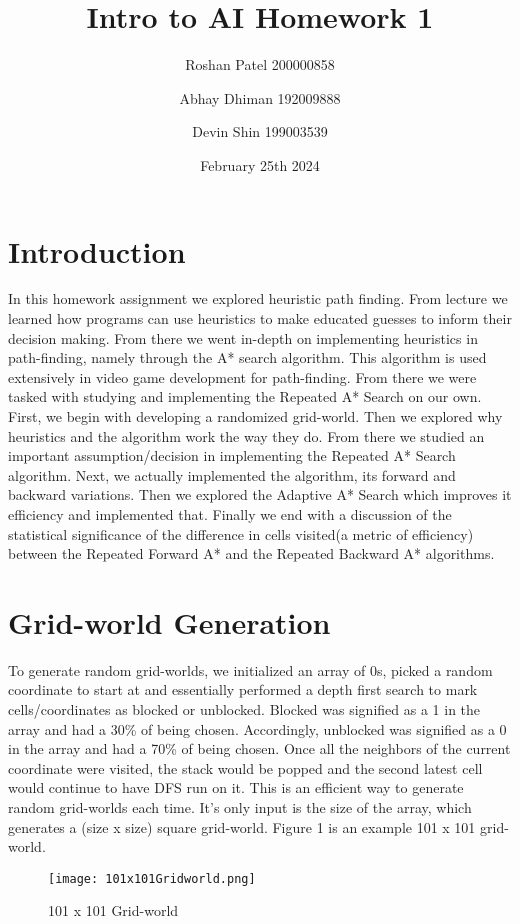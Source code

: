 \documentclass{article}
\title{Intro to AI Homework 1}
\author{Roshan Patel 200000858\\
 \and Abhay Dhiman 192009888\\
 \and Devin Shin 199003539}
\date{February 25th 2024}
\begin{document}
\maketitle

\section{Introduction}
In this homework assignment we explored heuristic path finding.  From lecture we learned how programs can use heuristics to make educated guesses to inform their decision making. From there we went in-depth on implementing heuristics in path-finding, namely through the A* search algorithm. This algorithm is used extensively in video game development for path-finding. From there we were tasked with studying and implementing the Repeated A* Search on our own.  
\newline
\newline
First, we begin with developing a randomized grid-world. Then we explored why heuristics and the algorithm work the way they do. From there we studied an important assumption/decision in implementing the Repeated A* Search algorithm. Next, we actually implemented the algorithm, its forward and backward variations. Then we explored the Adaptive A* Search which improves it efficiency and implemented that. Finally we end with a discussion of the statistical significance of the difference in cells visited(a metric of efficiency) between the Repeated Forward A* and the Repeated Backward A* algorithms.
\section {Grid-world Generation}
To generate random grid-worlds, we initialized an array of 0s, picked a random coordinate to start at and essentially performed a depth first search to mark cells/coordinates as blocked or unblocked. Blocked was signified as a 1 in the array and had a 30\% of being chosen. Accordingly, unblocked was signified as a 0 in the array and had a 70\% of being chosen. Once all the neighbors of the current coordinate were visited, the stack would be popped and the second latest cell would continue to have DFS run on it. This is an efficient way to generate random grid-worlds each time. It's only input is the size of the array, which generates a (size x size) square grid-world. Figure 1 is an example 101 x 101 grid-world.
\begin{figure}[h]
    \centering
    \texttt{[image: 101x101Gridworld.png]}
    \caption{101 x 101 Grid-world}
    \label{fig:example}
\end{figure}
\end{document}
